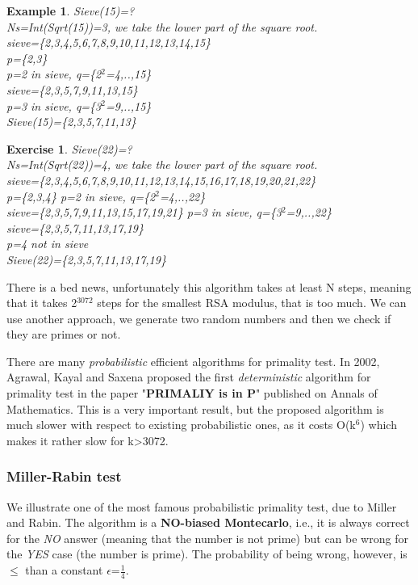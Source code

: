 \documentclass[a4paper, 12pt]{report}
\newtheorem{example}{\textbf{Example}}
\newtheorem{exercise}{\textbf{Exercise}}
\begin{document}
\begin{example}
	Sieve(15)=?\\
	Ns=Int(Sqrt(15))=3, we take the lower part of the square root.\\
	sieve=\{2,3,4,5,6,7,8,9,10,11,12,13,14,15\}\\
	p=\{2,3\}\\
	p=2 in sieve, q=\{2$^2$=4,..,15\}\\
	sieve=\{2,3,5,7,9,11,13,15\}\\
	p=3 in sieve, q=\{3$^2$=9,..,15\}\\
	Sieve(15)=\{2,3,5,7,11,13\}
\end{example}

\begin{exercise}
	Sieve(22)=?\\
	Ns=Int(Sqrt(22))=4, we take the lower part of the square root.\\
	sieve=\{2,3,4,5,6,7,8,9,10,11,12,13,14,15,16,17,18,19,20,21,22\}\\
	p=\{2,3,4\}
	p=2 in sieve, q=\{2$^2$=4,..,22\}\\
	sieve=\{2,3,5,7,9,11,13,15,17,19,21\}
	p=3 in sieve, q=\{3$^2$=9,..,22\}\\
	sieve=\{2,3,5,7,11,13,17,19\}\\
	p=4 not in sieve\\
	Sieve(22)=\{2,3,5,7,11,13,17,19\}
\end{exercise}

There is a bed news, unfortunately this algorithm takes at least N steps, meaning that it takes 2$^{3072}$ steps for the smallest RSA modulus, that is too much. We can use another approach, we generate two random numbers and then we check if they are primes or not.

There are many \textit{probabilistic} efficient algorithms for primality test. In 2002, Agrawal, Kayal and Saxena proposed the first \textit{deterministic} algorithm for primality test in the paper "\textbf{PRIMALIY is in P}" published on Annals of Mathematics. This is a very important result, but the proposed algorithm is much slower with respect to existing probabilistic ones, as it costs O(k$^6$) which makes it rather slow for k>3072.

\subsubsection{Miller-Rabin test}
We illustrate one of the most famous probabilistic primality test, due to Miller and Rabin. The algorithm is a \textbf{NO-biased Montecarlo}, i.e., it is always correct for the \textit{NO} answer (meaning that the number is not prime) but can be wrong for the \textit{YES} case (the number is prime). The probability of being wrong, however, is $\le$ than a constant $\epsilon$=$\frac{1}{4}$.
\end{document}
